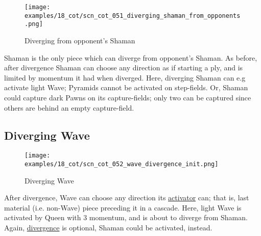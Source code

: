\vspace*{-1.4\baselineskip}
\noindent
\begin{figure}[!h]
\texttt{[image: examples/18\_cot/scn\_cot\_051\_diverging\_shaman\_from\_opponents.png]}
\vspace*{-1.3\baselineskip}
\caption{Diverging from opponent's Shaman}
\label{fig:scn_cot_051_diverging_shaman_from_opponents}
\end{figure}

\vspace*{-0.5\baselineskip}
Shaman is the only piece which can diverge from opponent's Shaman. As before, after
divergence Shaman can choose any direction as if starting a ply, and is limited by
momentum it had when diverged.\newline
\indent
Here, diverging Shaman can e.g activate light Wave; Pyramids cannot be activated
on step-fields. Or, Shaman could capture dark Pawns on its capture-fields; only two
can be captured since others are behind an empty capture-field.

\clearpage %

\subsection*{Diverging Wave}
\label{sec:Conquest of Tlalocan/Divergence/Diverging Wave}

\vspace*{-1.4\baselineskip}
\noindent
\begin{figure}[!h]
\texttt{[image: examples/18\_cot/scn\_cot\_052\_wave\_divergence\_init.png]}
\vspace*{-1.3\baselineskip}
\caption{Diverging Wave}
\label{fig:scn_cot_052_wave_divergence_init}
\end{figure}

\vspace*{-0.4\baselineskip}
After divergence, Wave can choose any direction its
\hyperref[fig:scn_mv_036_wave_cascading_steps]{activator} can; that is, last material
(i.e. non-Wave) piece preceding it in a cascade.\newline
\indent
Here, light Wave is activated by Queen with 3 momentum, and is about to diverge from
Shaman.\newline
\indent
Again, \hyperref[fig:scn_cot_030_own_shaman_is_divergent_init]{divergence} is optional,
Shaman could be activated, instead.

